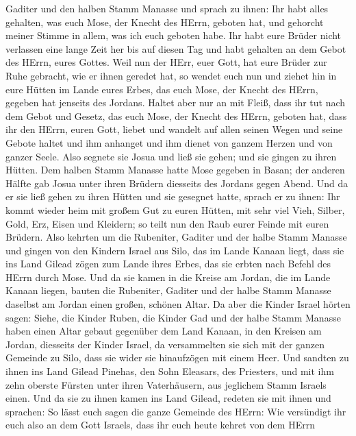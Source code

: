 Gaditer und den halben Stamm Manasse  und sprach zu ihnen:
Ihr habt alles gehalten, was euch Mose, der Knecht des HErrn, geboten
hat, und gehorcht meiner Stimme in allem, was ich euch geboten habe.
 Ihr habt eure Brüder nicht verlassen eine lange Zeit her
bis auf diesen Tag und habt gehalten an dem Gebot des HErrn, eures
Gottes.  Weil nun der HErr, euer Gott, hat eure Brüder zur
Ruhe gebracht, wie er ihnen geredet hat, so wendet euch nun und ziehet
hin in eure Hütten im Lande eures Erbes, das euch Mose, der Knecht des
HErrn, gegeben hat jenseits des Jordans.  Haltet aber nur an
mit Fleiß, dass ihr tut nach dem Gebot und Gesetz, das euch Mose, der
Knecht des HErrn, geboten hat, dass ihr den HErrn, euren Gott, liebet
und wandelt auf allen seinen Wegen und seine Gebote haltet und ihm
anhanget und ihm dienet von ganzem Herzen und von ganzer Seele.
 Also segnete sie Josua und ließ sie gehen; und sie gingen
zu ihren Hütten.  Dem halben Stamm Manasse hatte Mose
gegeben in Basan; der anderen Hälfte gab Josua unter ihren Brüdern
diesseits des Jordans gegen Abend. Und da er sie ließ gehen zu ihren
Hütten und sie gesegnet hatte,  sprach er zu ihnen: Ihr
kommt wieder heim mit großem Gut zu euren Hütten, mit sehr viel Vieh,
Silber, Gold, Erz, Eisen und Kleidern; so teilt nun den Raub eurer
Feinde mit euren Brüdern.  Also kehrten um die Rubeniter,
Gaditer und der halbe Stamm Manasse und gingen von den Kindern Israel
aus Silo, das im Lande Kanaan liegt, dass sie ins Land Gilead zögen zum
Lande ihres Erbes, das sie erbten nach Befehl des HErrn durch Mose.
 Und da sie kamen in die Kreise am Jordan, die im Lande
Kanaan liegen, bauten die Rubeniter, Gaditer und der halbe Stamm Manasse
daselbst am Jordan einen großen, schönen Altar.  Da aber
die Kinder Israel hörten sagen: Siehe, die Kinder Ruben, die Kinder Gad
und der halbe Stamm Manasse haben einen Altar gebaut gegenüber dem Land
Kanaan, in den Kreisen am Jordan, diesseits der Kinder Israel,
 da versammelten sie sich mit der ganzen Gemeinde zu Silo,
dass sie wider sie hinaufzögen mit einem Heer.  Und sandten
zu ihnen ins Land Gilead Pinehas, den Sohn Eleasars, des Priesters,
 und mit ihm zehn oberste Fürsten unter ihren Vaterhäusern,
aus jeglichem Stamm Israels einen.  Und da sie zu ihnen
kamen ins Land Gilead, redeten sie mit ihnen und sprachen: 
So lässt euch sagen die ganze Gemeinde des HErrn: Wie versündigt ihr
euch also an dem Gott Israels, dass ihr euch heute kehret von dem HErrn
